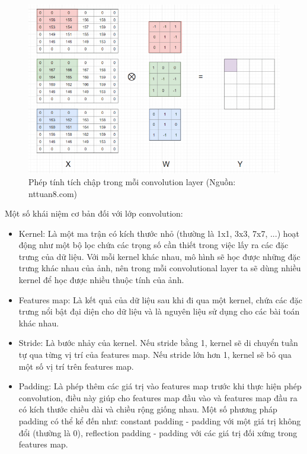 {    \begin{figure}[H]
    \centering
    \includegraphics[width=12cm] {images/conv.png}
    \caption{Phép tính tích chập trong mỗi convolution layer (Nguồn: nttuan8.com)}
    \label{fig:conv_layer}
    \end{figure}

    \noindent Một số khái niệm cơ bản đối với lớp convolution:
    \begin{itemize}[leftmargin=0cm,itemindent=.5cm,labelwidth=\itemindent,labelsep=0cm,align=left]
        \item Kernel: Là một ma trận có kích thước nhỏ (thường là 1x1, 3x3, 7x7, ...) hoạt động như một bộ lọc chứa các trọng số cần thiết trong việc lấy ra các đặc trưng của dữ liệu. Với mỗi kernel khác nhau, mô hình sẽ học được những đặc trưng khác nhau của ảnh, nên trong mỗi convolutional layer ta sẽ dùng nhiều kernel để học được nhiều thuộc tính của ảnh.
        \item Features map: Là kết quả của dữ liệu sau khi đi qua một kernel, chứa các đặc trưng nổi bật đại diện cho dữ liệu và là nguyên liệu sử dụng cho các bài toán khác nhau.
        \item Stride: Là bước nhảy của kernel. Nếu stride bằng 1, kernel sẽ di chuyển tuần tự qua từng vị trí của features map. Nếu stride lớn hơn 1, kernel sẽ bỏ qua một số vị trí trên features map.
        \item Padding: Là phép thêm các giá trị vào features map trước khi thực hiện phép convolution, điều này giúp cho features map đầu vào và features map đầu ra có kích thước chiều dài và chiều rộng giống nhau. Một số phương pháp padding có thể kể đến như: constant padding - padding với một giá trị không đổi (thường là 0), reflection padding - padding với các giá trị đối xứng trong features map.
    \end{itemize}
    
}
